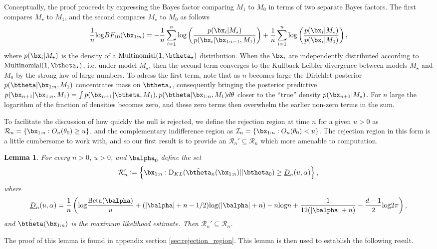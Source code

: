 \documentclass[11pt]{article}
\def\log{{\rm log}}
\newcommand{\Beta}{\mathrm{Beta}}
\newcommand{\KL}{\mathrm{D}_{KL}}
\newtheorem{lemma}{Lemma}[section]
\newcommand{\df}{\vcentcolon=}
\begin{document}
Conceptually, the proof proceeds by expressing the Bayes factor comparing $M_1$ to $M_0$ in terms of two separate Bayes factors.
The first compares $M_{\star}$ to $M_1$, and the second compares $M_{\star}$ to $M_0$ as follows
\begin{align*}
 \frac{1}{n} \log BF_{10}(\bx_{1:n}) = - \frac{1}{n}\sum_{i=1}^{n}\log \left( \frac{p(\bx_{i}|M_\star)}{p(\bx_{i}|\bx_{1:i-1},M_1)}\right) + \frac{1}{n}\sum_{i=1}^{n} \log  \left( \frac{p(\bx_{i}|M_\star)}{p(\bx_{i}|M_0)}\right),\\
\end{align*}
where  $p(\bx_i|M_\star)$ is the density of a $\text{Multinomial}(1,\btheta_{\star})$ distribution.
When the $\bx_i$ are independently distributed according to $\text{Multinomial}(1, \btheta_\star)$, i.e.
under model $M_\star$, then the second term converges to the Kullback-Leibler divergence between models $M_\star$ and $M_0$ by the strong law of large numbers.
To adress the first term, note that as $n$ becomes large the Dirichlet posterior $p(\btheta|\bx_{1:n}, M_1)$ concentrates mass on $\btheta_\star$, consequently bringing the posterior predictive $p(\bx_{n+1}|\bx_{1:n},M_1) =\int p(\bx_{n+1}|\btheta,M_1),p(\btheta|\bx_{1:n},M_1) d\theta$ closer to the ``true'' density $p(\bx_{n+1}|M_{\star})$.
For $n$ large the logarithm of the fraction of densities becomes zero, and these zero terms then overwhelm the earlier non-zero terms in the sum.

To facilitate the discussion of how quickly the null is rejected, we define the rejection region at time $n$ for a given $u>0$ as $\mathcal{R}_n = \{ \bx_{1:n} : O_n(\theta_0) \geq u \}$,
and the complementary indifference region as $\mathcal{I}_n = \{ \bx_{1:n} : O_n(\theta_0) < u \}$. 
The rejection region in this form is a little cumbersome to work with,
and so our first result is to provide an $\mathcal R_n'\subseteq \mathcal R_n$ which more amenable to computation.
\begin{lemma}\label{thm:calRprime}
  For every $n>0$, $u>0$, and $\balpha_0$ define the set
  \begin{equation}
    \label{eq:decision_boundary}
    \mathcal R_n'\df 
    \left\{
      \bx_{1:n} :
      \KL(\hat\btheta_n(\bx_{1:n})|| \btheta_0)
      \geq \underline{D}_n(u,\alpha) 
    \right\},
  \end{equation}
  where
  \begin{equation*}
    \underline{D}_n(u,\alpha) = \frac{1}{n}\left( \log \frac{\Beta(\balpha)}{u} +(|\balpha|+n-1/2)\log(|\balpha|+n)-n\log n + \frac{1}{12(|\balpha|+n)} - \frac{d-1}{2}\log 2\pi\right),
  \end{equation*}
  and $\hat{\btheta}(\bx_{1:n})$ is the maximum likelihood estimate.
Then $\mathcal{R}_n'  \subseteq \mathcal R_n$.
\end{lemma}
The proof of this lemma is found in appendix section \ref{sec:rejection_region}.
This lemma is then used to establish the following result.
\end{document}
